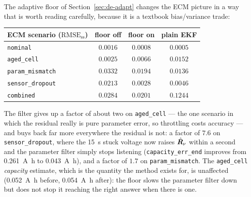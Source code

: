 The adaptive floor of Section~\ref{sec:de-adapt} changes the ECM picture in a way that is worth
reading carefully, because it is a textbook bias/variance trade:
\begin{center}
\begin{tabular}{@{}lccc@{}}
\toprule
ECM scenario ($\text{RMSE}_\text{ss}$) & floor off & floor on & plain EKF\\
\midrule
\texttt{nominal}        & $0.0016$ & $0.0008$ & $0.0005$\\
\texttt{aged\_cell}     & $0.0025$ & $0.0066$ & $0.0152$\\
\texttt{param\_mismatch}& $0.0332$ & $0.0194$ & $0.0136$\\
\texttt{sensor\_dropout}& $0.0213$ & $\mathbf{0.0028}$ & $0.0046$\\
\texttt{combined}       & $0.0284$ & $0.0201$ & $0.1244$\\
\bottomrule
\end{tabular}
\end{center}
The filter gives up a factor of about two on \texttt{aged\_cell} --- the one scenario in which the
residual really is pure parameter error, so throttling costs accuracy --- and buys back far more
everywhere the residual is not: a factor of $7.6$ on \texttt{sensor\_dropout}, where the
\SI{15}{\second} stuck voltage now raises $\hat{\bm{R}}_\nu$ within a second and the parameter filter
simply stops listening (\texttt{capacity\_err\_end} improves from \SI{+0.261}{\ampere\hour} to
\SI{+0.043}{\ampere\hour}), and a factor of $1.7$ on \texttt{param\_mismatch}.  The
\texttt{aged\_cell} \emph{capacity} estimate, which is the quantity the method exists for, is
unaffected (\SI{+0.052}{\ampere\hour} before, \SI{+0.054}{\ampere\hour} after): the floor slows the
parameter filter down but does not stop it reaching the right answer when there is one.

